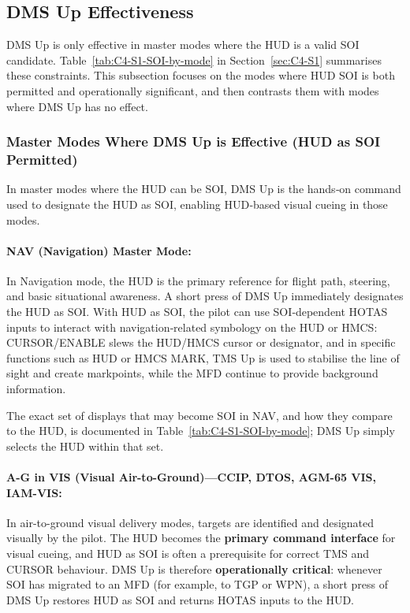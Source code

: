 \documentclass[11pt, a4paper, twoside]{report}
\begin{document}
\subsection{DMS Up Effectiveness}
\label{sec:C4-S2-S1}

DMS Up is only effective in master modes where the HUD is a valid SOI candidate. Table~\ref{tab:C4-S1-SOI-by-mode} in Section~\ref{sec:C4-S1} summarises these constraints. This subsection focuses on the modes where HUD SOI is both permitted and operationally significant, and then contrasts them with modes where DMS Up has no effect.

\subsubsection{Master Modes Where DMS Up is Effective (HUD as SOI Permitted)}
\label{sec:C4-S2-S1-S1}

In master modes where the HUD can be SOI, DMS Up is the hands‑on command used to designate the HUD as SOI, enabling HUD‑based visual cueing in those modes.

\paragraph*{NAV (Navigation) Master Mode:}
In Navigation mode, the HUD is the primary reference for flight path, steering, and basic situational awareness. A short press of DMS Up immediately designates the HUD as SOI. With HUD as SOI, the pilot can use SOI‑dependent HOTAS inputs to interact with navigation‑related symbology on the HUD or HMCS: CURSOR/ENABLE slews the HUD/HMCS cursor or designator, and in specific functions such as HUD or HMCS MARK, TMS Up is used to stabilise the line of sight and create markpoints, while the MFD continue to provide background information.

The exact set of displays that may become SOI in NAV, and how they compare to the HUD, is documented in Table~\ref{tab:C4-S1-SOI-by-mode}; DMS Up simply selects the HUD within that set.

\paragraph*{A-G in VIS (Visual Air-to-Ground)---CCIP, DTOS, AGM-65 VIS, IAM-VIS:}
In air-to-ground visual delivery modes, targets are identified and designated visually by the pilot. The HUD becomes the \textbf{primary command interface} for visual cueing, and HUD as SOI is often a prerequisite for correct TMS and CURSOR behaviour. DMS Up is therefore \textbf{operationally critical}: whenever SOI has migrated to an MFD (for example, to TGP or WPN), a short press of DMS Up restores HUD as SOI and returns HOTAS inputs to the HUD.
\end{document}

